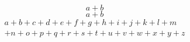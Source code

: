 \documentclass[11pt]{article}
\begin{document}
\begin{equation}
a+b
\end{equation}
\begin{equation*}
a+b
\end{equation*}
\begin{multline}
a+b+c+d+e+f+g+h+i+j+k+l+m\\
+n+o+p+q+r+s+t+u+v+w+x+y+z
\end{multline}
\end{document}
